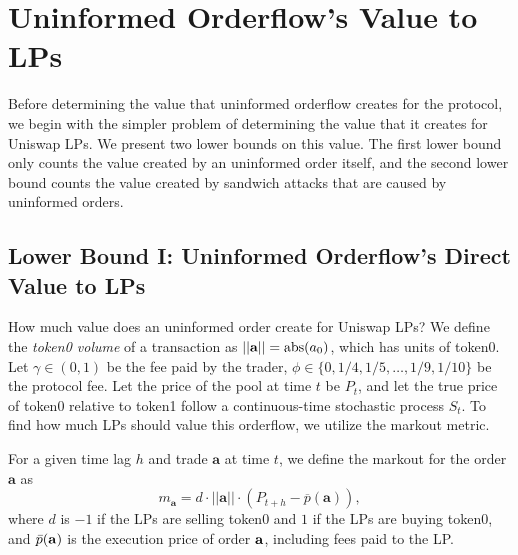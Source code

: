 \section{Uninformed Orderflow's Value to LPs} \label{section:lp-oflow-value}
Before determining the value that uninformed orderflow creates for the protocol, we begin with the simpler problem of determining the value that it creates for Uniswap LPs. We present two lower bounds on this value. The first lower bound only counts the value created by an uninformed order itself, and the second lower bound counts the value created by sandwich attacks that are caused by uninformed orders.
    
\subsection{Lower Bound I: Uninformed Orderflow's Direct Value to LPs}
    How much value does an uninformed order create for Uniswap LPs?
    We define the \textit{token0 volume} of a transaction as $||\textbf a|| = \text{abs}(a_0)$, which has units of token0. Let $\gamma \in (0,1)$ be the fee paid by the trader, $\phi \in \{0, 1/4, 1/5, \dots, 1/9, 1/10 \}$ be the protocol fee. Let the price of the pool at time $t$ be $P_t$, and let the true price of token0 relative to token1 follow a continuous-time stochastic process $S_t$. To find how much LPs should value this orderflow, we utilize the markout metric.

    \begin{definition}[$h$-Markout]
        For a given time lag $h$ and trade $\textbf{a}$ at time $t$, we define the markout for the order $\textbf{a}$ as 
        $$m_{\textbf{a}} = d \cdot ||\textbf{a}|| \cdot (P_{t + h} - \overline p(\textbf{a})),$$
        where $d$ is $-1$ if the LPs are selling token0 and $1$ if the LPs are buying token0, and $\bar p(\bf a)$ is the execution price of order $\bf a$, including fees paid to the LP.
    \end{definition}

